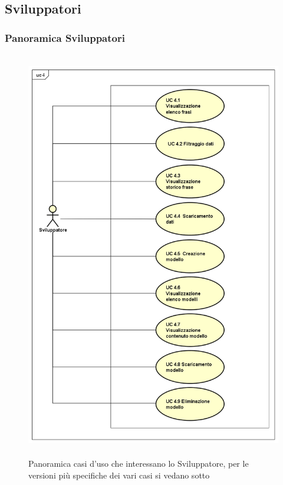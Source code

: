 \subsection{Sviluppatori}
\subsubsection{Panoramica Sviluppatori}
\begin{figure}[H]
\centering
\includegraphics[width=17cm, height=18cm]{img/UC4x.png} 
\caption{Panoramica casi d'uso che interessano lo Sviluppatore, per le versioni più specifiche dei vari casi si vedano sotto}\label{fig:4x}
\end{figure}
